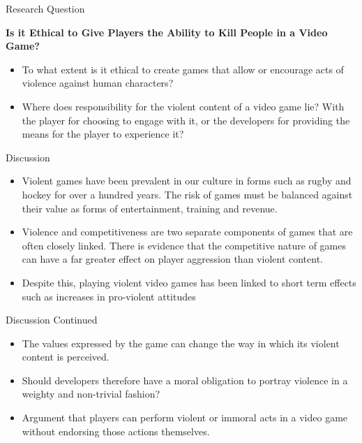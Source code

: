 \documentclass{beamer}
\begin{document}
\begin{frame}{Research Question}

	\textbf{Is it Ethical to Give Players the Ability to Kill People in a Video Game?} \newline
	    
    \begin{itemize}
    	\item To what extent is it ethical to create games that allow or encourage acts of violence against human characters?
    	
        \item Where does responsibility for the violent content of a video game lie? With the player for choosing to engage with it, or the developers for providing the means for the player to experience it?        
    \end{itemize}
\end{frame} 

\begin{frame}{Discussion}

	\begin{itemize}
		\item Violent games have been prevalent in our culture in forms such as rugby and hockey for over a hundred years. The risk of games must be balanced against their value as forms of entertainment, training and revenue. \cite{wrongToPlayGames}  
		
		\item Violence and competitiveness are two separate components of games that are often closely linked. There is evidence that the competitive nature of games can have a far greater effect on player aggression than violent content. \cite{Competativness}	
		
		\item Despite this, playing violent video games has been linked to short term effects such as increases in pro-violent attitudes \cite{anderson2007violent}		
	\end{itemize}
\end{frame}

\begin{frame}{Discussion Continued}
	\begin{itemize}
		\item The values expressed by the game can change the way in which its violent content is perceived. \cite{ValueViolence}
		
		\item Should developers therefore have a moral obligation to portray violence in a weighty and non-trivial fashion?	
		
		\item Argument that players can perform violent or immoral acts in a video game without endorsing those actions themselves. \cite{FreeWill}
	\end{itemize}
\end{frame}
\end{document}
